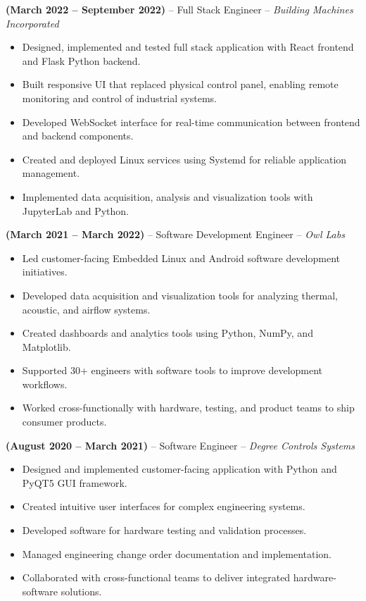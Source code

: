 \documentclass[11pt,a4paper]{article}
\newcommand{\jobentry}[2]{
  \vspace{0.5\baselineskip}\textbf{#1} -- #2 
}
\begin{document}
\jobentry{(March 2022 -- September 2022)}{Full Stack Engineer -- \textit{Building Machines Incorporated}}
\begin{itemize}
\item Designed, implemented and tested full stack application with React frontend and Flask Python backend.
\item Built responsive UI that replaced physical control panel, enabling remote monitoring and control of industrial systems.
\item Developed WebSocket interface for real-time communication between frontend and backend components.
\item Created and deployed Linux services using Systemd for reliable application management.
\item Implemented data acquisition, analysis and visualization tools with JupyterLab and Python.
\end{itemize}

\jobentry{(March 2021 -- March 2022)}{Software Development Engineer -- \textit{Owl Labs}}
\begin{itemize}
\item Led customer-facing Embedded Linux and Android software development initiatives.
\item Developed data acquisition and visualization tools for analyzing thermal, acoustic, and airflow systems.
\item Created dashboards and analytics tools using Python, NumPy, and Matplotlib.
\item Supported 30+ engineers with software tools to improve development workflows.
\item Worked cross-functionally with hardware, testing, and product teams to ship consumer products.
\end{itemize}

\jobentry{(August 2020 -- March 2021)}{Software Engineer -- \textit{Degree Controls Systems}}
\begin{itemize}
\item Designed and implemented customer-facing application with Python and PyQT5 GUI framework.
\item Created intuitive user interfaces for complex engineering systems.
\item Developed software for hardware testing and validation processes.
\item Managed engineering change order documentation and implementation.
\item Collaborated with cross-functional teams to deliver integrated hardware-software solutions.
\end{itemize}
\end{document}
